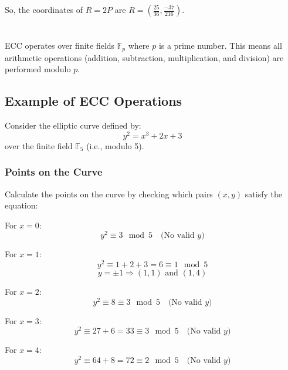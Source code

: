 \documentclass[11pt, letterpaper]{article}
\begin{document}
So, the coordinates of \(R = 2P\) are \(R = \left(\frac{25}{36}, \frac{-37}{216}\right)\).


\section*{}
ECC operates over finite fields \(\mathbb{F}_p\) where \(p\) is a prime number. This means all arithmetic operations (addition, subtraction, multiplication, and division) are performed modulo \(p\).

\subsection{Example of ECC Operations}

Consider the elliptic curve defined by:
\begin{equation}
y^2 = x^3 + 2x + 3
\end{equation}
over the finite field \(\mathbb{F}_5\) (i.e., modulo 5).

\subsubsection*{Points on the Curve}
Calculate the points on the curve by checking which pairs \((x, y)\) satisfy the equation:

For \(x = 0\):
\begin{equation}
y^2 \equiv 3 \mod 5 \quad \text{(No valid } y\text{)}
\end{equation}

For \(x = 1\):
\begin{equation}
y^2 \equiv 1 + 2 + 3 = 6 \equiv 1 \mod 5
\end{equation}
\begin{equation}
y = \pm 1 \Rightarrow (1, 1) \text{ and } (1, 4)
\end{equation}

For \(x = 2\):
\begin{equation}
y^2 \equiv 8 \equiv 3 \mod 5 \quad \text{(No valid } y\text{)}
\end{equation}

For \(x = 3\):
\begin{equation}
y^2 \equiv 27 + 6 = 33 \equiv 3 \mod 5 \quad \text{(No valid } y\text{)}
\end{equation}

For \(x = 4\):
\begin{equation}
y^2 \equiv 64 + 8 = 72 \equiv 2 \mod 5 \quad \text{(No valid } y\text{)}
\end{equation}
\end{document}

